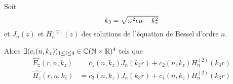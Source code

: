   \begin{prop}
    Soit
    \begin{equation}
      k_3 = \sqrt{\omega^2\epsilon\mu - k_z^2}
    \end{equation}
    et \(J_n(z)\) et \(H_n^{(2)}(z)\) des solutions de l'équation de Bessel d'ordre \(n\).

    Alors \(\exists (c_i(n,k_z))_{1\le i\le 4} \in \mathbb C(\mathbb N\times\mathbb R)^4\) tels que
    \begin{subequations}
      \begin{align}
        \hat{E_z}(r,n,k_z) &= c_1(n,k_z) J_n\left(k_3r\right) + c_2(n,k_z) H_n^{(2)}\left(k_3r\right)
        \\
        \hat{H_z}(r,n,k_z) &= c_3(n,k_z) J_n\left(k_3r\right) + c_4(n,k_z) H_n^{(2)}\left(k_3r\right)
      \end{align}
    \end{subequations}
  \end{prop}

